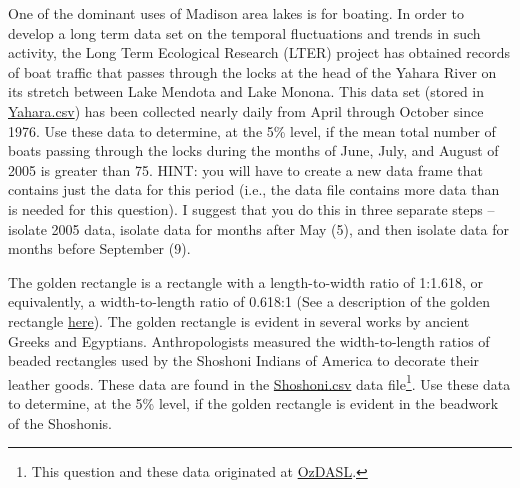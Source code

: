 \documentclass[10pt,openany]{book}\usepackage[]{graphicx}\usepackage[]{color}
\begin{document}
\begin{exsection}
  \item \label{revex:tTestYahara1} \rhw{} One of the dominant uses of Madison area lakes is for boating.  In order to develop a long term data set on the temporal fluctuations and trends in such activity, the Long Term Ecological Research (LTER) project has obtained records of boat traffic that passes through the locks at the head of the Yahara River on its stretch between Lake Mendota and Lake Monona.  This data set (stored in \href{https://raw.githubusercontent.com/droglenc/NCData/master/Yahara.csv}{Yahara.csv}) has been collected nearly daily from April through October since 1976.  Use these data to determine, at the 5\% level, if the mean total number of boats passing through the locks during the months of June, July, and August of 2005 is greater than 75.  HINT: you will have to create a new data frame that contains just the data for this period (i.e., the data file contains more data than is needed for this question).  I suggest that you do this in three separate steps -- isolate 2005 data, isolate data for months after May (5), and then isolate data for months before September (9). 

  \item \label{revex:tTestBeads} \rhw{} The golden rectangle is a rectangle with a length-to-width ratio of 1:1.618, or equivalently, a width-to-length ratio of 0.618:1 (See a description of the golden rectangle \href{http://en.wikipedia.org/wiki/Golden_rectangle}{here}).  The golden rectangle is evident in several works by ancient Greeks and Egyptians.  Anthropologists measured the width-to-length ratios of beaded rectangles used by the Shoshoni Indians of America to decorate their leather goods.  These data are found in the \href{https://raw.githubusercontent.com/droglenc/NCData/master/Shoshoni.csv}{Shoshoni.csv} data file\footnote{This question and these data originated at \href{http://www.statsci.org/data/general/shoshoni.html}{OzDASL}.}.  Use these data to determine, at the 5\% level, if the golden rectangle is evident in the beadwork of the Shoshonis. 

\end{exsection}
\end{document}
